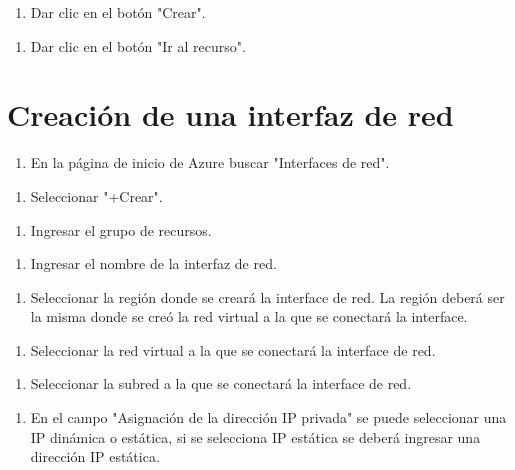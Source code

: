 \begin{enumerate}
\item Dar clic en el botón "Crear".
\end{enumerate}

\begin{enumerate}
\item Dar clic en el botón "Ir al recurso".
\end{enumerate}

\section{Creación de una interfaz de red}

\begin{enumerate}
\item En la página de inicio de Azure buscar "Interfaces de red".
\end{enumerate}

\begin{enumerate}
\item Seleccionar "+Crear".
\end{enumerate}

\begin{enumerate}
\item Ingresar el grupo de recursos.
\end{enumerate}

\begin{enumerate}
\item Ingresar el nombre de la interfaz de red.
\end{enumerate}

\begin{enumerate}
\item Seleccionar la región donde se creará la interface de red. La región deberá ser la misma donde se creó la red virtual a la que se conectará la interface.
\end{enumerate}

\begin{enumerate}
\item Seleccionar la red virtual a la que se conectará la interface de red.
\end{enumerate}

\begin{enumerate}
\item Seleccionar la subred a la que se conectará la interface de red.
\end{enumerate}

\begin{enumerate}
\item En el campo "Asignación de la dirección IP privada" se puede seleccionar una IP dinámica o estática, si se selecciona IP estática se deberá ingresar una dirección IP estática.
\end{enumerate}

